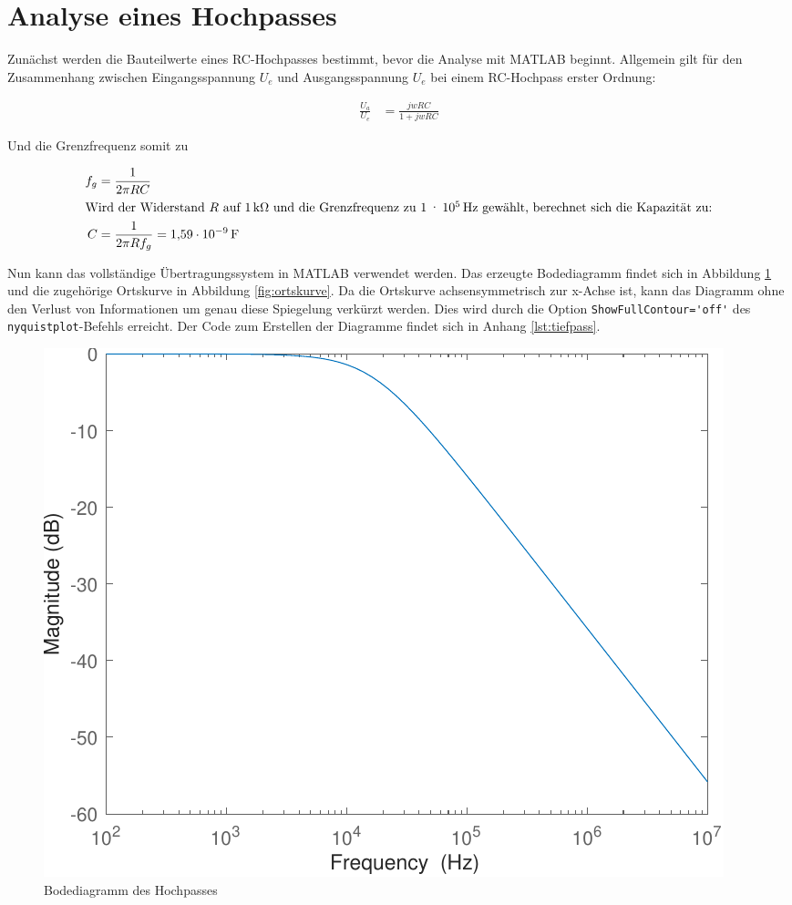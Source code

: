 \documentclass[
    paper=a4,
    fontsize=10pt,
    DIV=13,
    oneside,
]{scrartcl}
\begin{document}
\section{Analyse eines Hochpasses}
    Zunächst werden die Bauteilwerte eines RC-Hochpasses bestimmt, bevor die Analyse mit MATLAB beginnt. Allgemein gilt für den Zusammenhang zwischen Eingangsspannung \(U_e\) und Ausgangsspannung \(U_e\) bei einem RC-Hochpass erster Ordnung:
    
    \begin{align}
        \label{eq:hochpass}
        \frac{U_a}{U_e} &= \frac{jwRC}{1+jwRC}
    \end{align}

    Und die Grenzfrequenz somit zu
    
    \begin{align}
        f_g &= \frac{1}{2 \pi R C}\\
        \intertext{Wird der Widerstand \(R\) auf \SI{1}{\kilo\ohm} und die Grenzfrequenz zu \SI{1e5}{\hertz} gewählt, berechnet sich die Kapazität zu:}
        C &= \frac{1}{2 \pi R f_g} = \SI{1.59e-9}{\farad}
    \end{align}

    Nun kann das vollständige Übertragungssystem in MATLAB verwendet werden. Das erzeugte Bodediagramm findet sich in Abbildung \ref{fig:bode} und die zugehörige Ortskurve in Abbildung \ref{fig:ortskurve}. Da die Ortskurve achsensymmetrisch zur x-Achse ist, kann das Diagramm ohne den Verlust von Informationen um genau diese Spiegelung verkürzt werden. Dies wird durch die Option \verb|ShowFullContour='off'| des \verb|nyquistplot|-Befehls erreicht. Der Code zum Erstellen der Diagramme findet sich in Anhang \ref{lst:tiefpass}.

    \begin{figure}
        \centering
        \includegraphics[width=\imagewidth]{../versuch1/bode}
        \caption{Bodediagramm des Hochpasses}
        \label{fig:bode}
    \end{figure}
\end{document}
